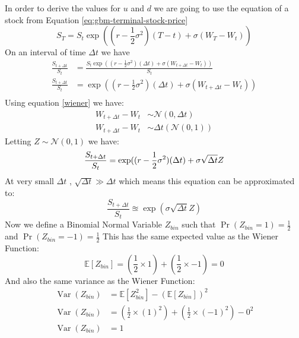 \documentclass[12pt]{article}
\numberwithin{equation}{section}
\begin{document}
In order to derive the values for $u$ and $d$ we are going to use the equation of a stock from Equation \ref{eq:gbm-terminal-stock-price}
\begin{equation*} 
S_T = S_t \exp((r-\frac{1}{2}\sigma^2) (T-t) + \sigma(W_T - W_t))
\end{equation*}
On an interval of time $\Delta t$ we have
\begin{equation*} 
	\begin{aligned}
	\frac{S_{t+\Delta t}}{S_t} &= \frac{S_t\exp((r-\frac{1}{2}\sigma^2) (\Delta t) + \sigma(W_{t +\Delta t} - W_t))}{S_t} \\
	\frac{S_{t+\Delta t}}{S_t} &= \exp((r-\frac{1}{2}\sigma^2) (\Delta t) + \sigma(W_{t +\Delta t} - W_t)) \\
	\end{aligned}
\end{equation*}
Using equation \ref{wiener} we have:
\begin{equation*}
	\begin{aligned}
	W_{t+\Delta t} - W_t &\sim \mathcal {N} (0, \Delta t) \\
	W_{t+\Delta t} - W_t &\sim \Delta t (\mathcal {N} (0,1) )
	\end{aligned}
\end{equation*}
Letting $Z \sim \mathcal{N}(0,1)$ we have:
\begin{equation*}
	\frac{S_{t+\Delta t}}{S_t} = \exp((r-\frac{1}{2}\sigma^2) (\Delta t) + \sigma \sqrt{\Delta t} Z \\
\end{equation*}
At very small $\Delta t$ , $\sqrt{\Delta t} \gg \Delta t$  which means this equation can be approximated to:
\begin{equation}
	\frac{S_{t+\Delta t}}{S_t} \approxeq \exp(\sigma \sqrt{\Delta t} Z) 
\end{equation}
Now we define a Binomial Normal Variable $Z_{bin}$ such that $\Pr(Z_{bin} = 1 ) = \frac{1}{2}$ and $\Pr(Z_{bin} = -1) = \frac{1}{2}$
This has the same expected value as the Wiener Function:
\begin{equation}
\mathbb{E}[Z_{bin}] = (\frac{1}{2} \times 1) + (\frac{1}{2} \times -1) = 0
\end{equation}
And also the same variance as the Wiener Function:
\begin{equation}
	\begin{aligned}
	\operatorname{Var}(Z_{bin})&= \mathbb{E}[Z^2_{bin}] - (\mathbb{E}[Z_{bin}])^2 \\
	\operatorname{Var}(Z_{bin})&= (\frac{1}{2} \times (1)^2) + (\frac{1}{2} \times (-1) ^ 2)  - 0^2 \\
	\operatorname{Var}(Z_{bin})&= 1
	\end{aligned}
\end{equation}
\end{document}
